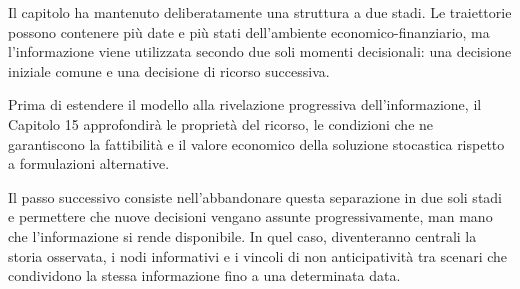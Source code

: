 Il capitolo ha mantenuto deliberatamente una struttura a due stadi. Le
traiettorie possono contenere pi\`u date e pi\`u stati dell'ambiente
economico-finanziario, ma l'informazione viene utilizzata secondo due soli
momenti decisionali: una decisione iniziale comune e una decisione di
ricorso successiva.

Prima di estendere il modello alla rivelazione progressiva dell'informazione, il Capitolo 15 approfondir\`a le propriet\`a del ricorso, le condizioni che ne garantiscono la fattibilit\`a e il valore economico della soluzione stocastica rispetto a formulazioni alternative.

Il passo successivo consiste nell'abbandonare questa separazione in due soli
stadi e permettere che nuove decisioni vengano assunte progressivamente,
man mano che l'informazione si rende disponibile. In quel caso, diventeranno
centrali la storia osservata, i nodi informativi e i vincoli di
non anticipativit\`a tra scenari che condividono la stessa informazione fino a
una determinata data.



